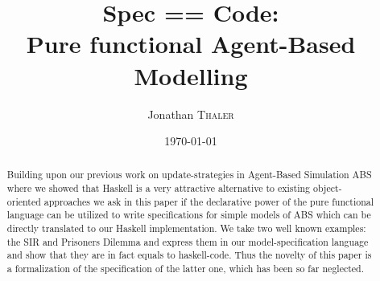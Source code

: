 \documentclass{article}
\title{Spec == Code:\\Pure functional Agent-Based Modelling} %
\author{Jonathan \textsc{Thaler}} %
\date{\today} %
\begin{document}
\maketitle %

\begin{abstract}
Building upon our previous work on update-strategies in Agent-Based Simulation ABS where we showed that Haskell is a very attractive alternative to existing object-oriented approaches we ask in this paper if the declarative power of the pure functional language can be utilized to write specifications for simple models of ABS which can be directly translated to our Haskell implementation. We take two well known examples: the SIR and Prisoners Dilemma and express them in our model-specification language and show that they are in fact equals to haskell-code. Thus the novelty of this paper is a formalization of the specification of the latter one, which has been so far neglected.
\end{abstract}



















\newpage



\end{document}
